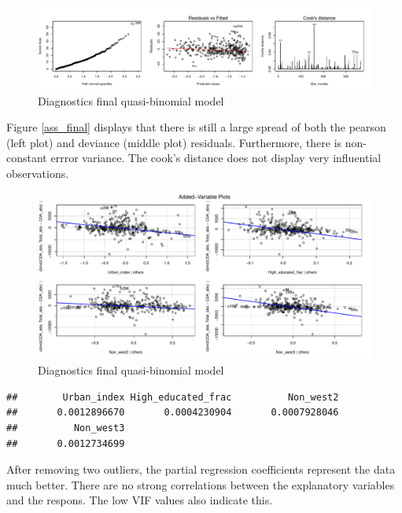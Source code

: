 \documentclass[11pt,]{article}
\begin{document}
\begin{figure}[H]

{\centering \includegraphics{Report_files/figure-latex/unnamed-chunk-22-1} 

}

\caption{\label{ass_final}Diagnostics final quasi-binomial model}\label{fig:unnamed-chunk-22}
\end{figure}

Figure \ref{ass_final} displays that there is still a large spread of
both the pearson (left plot) and deviance (middle plot) residuals.
Furthermore, there is non-constant errror variance. The cook's distance
does not display very influential observations.

\begin{figure}[H]

{\centering \includegraphics{Report_files/figure-latex/unnamed-chunk-23-1} 

}

\caption{\label{av_final}Diagnostics final quasi-binomial model}\label{fig:unnamed-chunk-23}
\end{figure}

\begin{verbatim}
##        Urban_index High_educated_frac          Non_west2 
##       0.0012896670       0.0004230904       0.0007928046 
##          Non_west3 
##       0.0012734699
\end{verbatim}

After removing two outliers, the partial regression coefficients
represent the data much better. There are no strong correlations between
the explanatory variables and the respons. The low VIF values also
indicate this.
\end{document}
